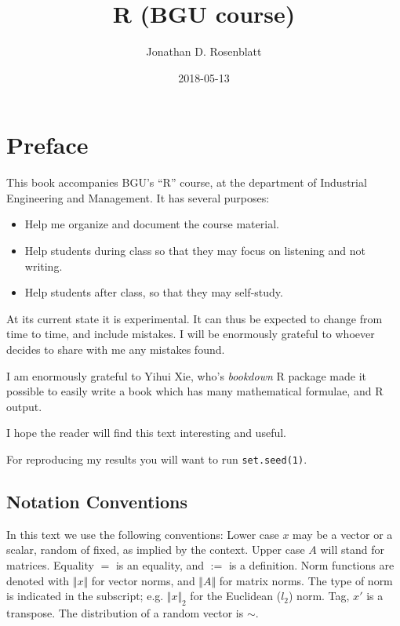 \documentclass[]{book}
\title{R (BGU course)}
\author{Jonathan D. Rosenblatt}
\date{2018-05-13}
\providecommand{\tightlist}{%
  \setlength{\itemsep}{0pt}\setlength{\parskip}{0pt}}
\theoremstyle{definition}
\theoremstyle{definition}
\theoremstyle{definition}
\theoremstyle{remark}
\begin{document}
\maketitle

{
\setcounter{tocdepth}{1}
\tableofcontents
}
\chapter{Preface}\label{preface}

This book accompanies BGU's ``R'' course, at the department of
Industrial Engineering and Management. It has several purposes:

\begin{itemize}
\tightlist
\item
  Help me organize and document the course material.
\item
  Help students during class so that they may focus on listening and not
  writing.
\item
  Help students after class, so that they may self-study.
\end{itemize}

At its current state it is experimental. It can thus be expected to
change from time to time, and include mistakes. I will be enormously
grateful to whoever decides to share with me any mistakes found.

I am enormously grateful to Yihui Xie, who's \emph{bookdown} R package
made it possible to easily write a book which has many mathematical
formulae, and R output.

I hope the reader will find this text interesting and useful.

For reproducing my results you will want to run \texttt{set.seed(1)}.

\section{Notation Conventions}\label{notation-conventions}

In this text we use the following conventions: Lower case \(x\) may be a
vector or a scalar, random of fixed, as implied by the context. Upper
case \(A\) will stand for matrices. Equality \(=\) is an equality, and
\(:=\) is a definition. Norm functions are denoted with
\(\Vert x \Vert\) for vector norms, and \(\Vert A \Vert\) for matrix
norms. The type of norm is indicated in the subscript; e.g.
\(\Vert x \Vert_2\) for the Euclidean (\(l_2\)) norm. Tag, \(x'\) is a
transpose. The distribution of a random vector is \(\sim\).
\end{document}
